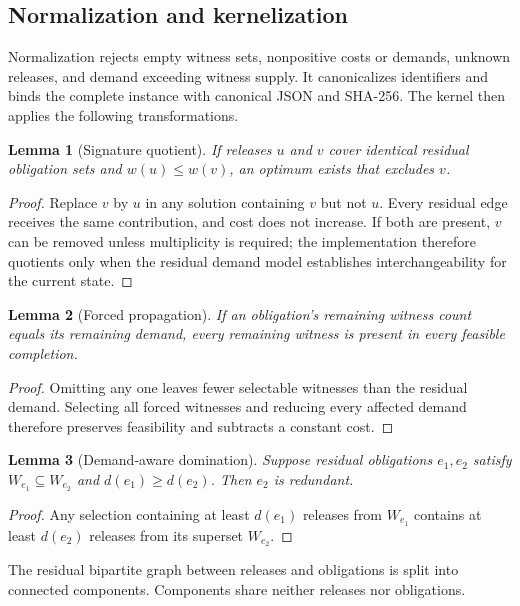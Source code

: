 \documentclass[10pt,conference]{IEEEtran}
\newtheorem{lemma}{Lemma}
\begin{document}
\subsection{Normalization and kernelization}
Normalization rejects empty witness sets, nonpositive costs or demands, unknown releases, and demand exceeding witness supply. It canonicalizes identifiers and binds the complete instance with canonical JSON and SHA-256. The kernel then applies the following transformations.

\begin{lemma}[Signature quotient]
If releases $u$ and $v$ cover identical residual obligation sets and $w(u)\le w(v)$, an optimum exists that excludes $v$.
\end{lemma}
\begin{proof}
Replace $v$ by $u$ in any solution containing $v$ but not $u$. Every residual edge receives the same contribution, and cost does not increase. If both are present, $v$ can be removed unless multiplicity is required; the implementation therefore quotients only when the residual demand model establishes interchangeability for the current state.
\end{proof}

\begin{lemma}[Forced propagation]
If an obligation's remaining witness count equals its remaining demand, every remaining witness is present in every feasible completion.
\end{lemma}
\begin{proof}
Omitting any one leaves fewer selectable witnesses than the residual demand. Selecting all forced witnesses and reducing every affected demand therefore preserves feasibility and subtracts a constant cost.
\end{proof}

\begin{lemma}[Demand-aware domination]
Suppose residual obligations $e_1,e_2$ satisfy $W_{e_1}\subseteq W_{e_2}$ and $d(e_1)\ge d(e_2)$. Then $e_2$ is redundant.
\end{lemma}
\begin{proof}
Any selection containing at least $d(e_1)$ releases from $W_{e_1}$ contains at least $d(e_2)$ releases from its superset $W_{e_2}$.
\end{proof}

The residual bipartite graph between releases and obligations is split into connected components. Components share neither releases nor obligations.
\end{document}
